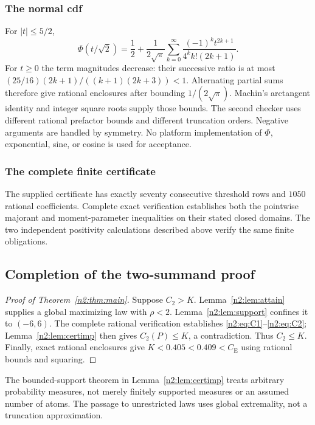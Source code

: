 \documentclass[11pt,a4paper]{article}
\numberwithin{equation}{section}
\theoremstyle{definition}
\theoremstyle{remark}
\newcommand{\CE}{C_{\mathrm E}}
\begin{document}
\subsubsection{The normal cdf}
For $|t|\le5/2$,
\begin{equation}\label{n2:eq:normal}
 \Phi(t/\sqrt2)=\frac12+\frac1{2\sqrt\pi}
 \sum_{k=0}^\infty\frac{(-1)^k t^{2k+1}}{4^k k!(2k+1)}.
\end{equation}
For $t\ge0$ the term magnitudes decrease: their successive ratio is at most
$(25/16)(2k+1)/((k+1)(2k+3))<1$. Alternating partial sums therefore give
rational enclosures after bounding $1/(2\sqrt\pi)$. Machin's arctangent
identity and integer square roots supply those bounds. The second checker
uses different rational prefactor bounds and different truncation orders.
Negative arguments are handled by symmetry. No platform implementation of
$\Phi$, exponential, sine, or cosine is used for acceptance.

\subsubsection{The complete finite certificate}
The supplied certificate has exactly seventy consecutive threshold
rows and \(1050\) rational coefficients. Complete exact verification
establishes both the pointwise majorant and moment-parameter inequalities
on their stated closed domains. The two independent positivity
calculations described above verify the same finite obligations.

\subsection{Completion of the two-summand proof}
\begin{proof}[Proof of Theorem~\ref{n2:thm:main}]
Suppose $C_2>K$. Lemma~\ref{n2:lem:attain} supplies a global maximizing law
with $\rho<2$. Lemma~\ref{n2:lem:support} confines it to $(-6,6)$.
The complete rational verification establishes \eqref{n2:eq:C1}--\eqref{n2:eq:C2};
Lemma~\ref{n2:lem:certimp} then gives $C_2(P)\le K$, a contradiction.
Thus $C_2\le K$. Finally, exact rational enclosures give $K<0.405<0.409<\CE$
using rational bounds and squaring.
\end{proof}
The bounded-support theorem in Lemma~\ref{n2:lem:certimp} treats arbitrary
probability measures, not merely finitely supported measures or an assumed
number of atoms. The passage to unrestricted laws uses global extremality,
not a truncation approximation.
\end{document}
